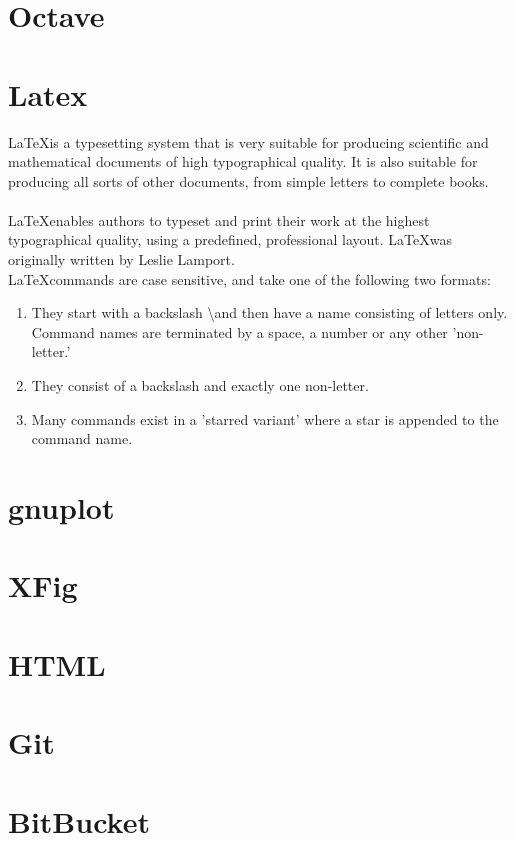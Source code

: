 \documentclass{article}
\begin{document}
	\section{Octave}
	\section{Latex}
	\LaTeX is a typesetting system that is very suitable for producing scientific and mathematical documents of high typographical quality. It is also suitable for producing all sorts of other documents, from simple letters to complete books.\\
	\\
	\LaTeX enables authors to typeset and print their work at the highest typographical quality, using a predefined, professional layout. \LaTeX was originally written by Leslie Lamport.\\
	
	\LaTeX commands are case sensitive, and take one of the following two formats:
	\begin{enumerate}
		\item They start with a backslash \textbackslash and then have a name consisting of
		letters only. Command names are terminated by a space, a number or
		any other 'non-letter.'
		\item They consist of a backslash and exactly one non-letter.
		\item Many commands exist in a 'starred variant' where a star is appended
		to the command name.
	\end{enumerate}
	
		\section{gnuplot}
		\section{XFig}
		\section{HTML}
		\section{Git}
		\section{BitBucket}
		
	
\end{document}
